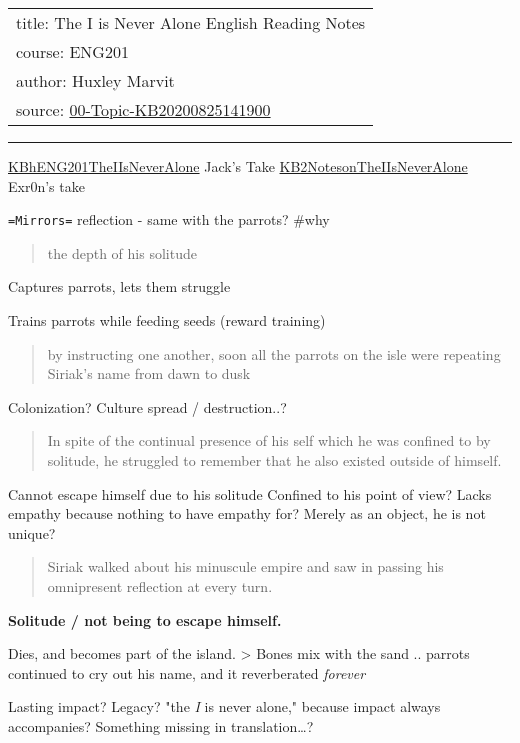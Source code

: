 \documentclass[letterpaper]{article}
\date{\today}
\title{}
\renewcommand{\tableofcontents}{}
\begin{document}
\tableofcontents

\begin{center}
\begin{tabular}{l}
title: The I is Never Alone English Reading Notes\\
course: ENG201\\
author: Huxley Marvit\\
source: \href{00-Topic-KB20200825141900.org}{00-Topic-KB20200825141900}\\
\end{tabular}
\end{center}

\noindent\rule{\textwidth}{0.5pt}

\href{KBhENG201TheIIsNeverAlone.org}{KBhENG201TheIIsNeverAlone} Jack's
Take \href{KB2NotesonTheIIsNeverAlone.org}{KB2NotesonTheIIsNeverAlone}
Exr0n's take

\texttt{=Mirrors=} reflection - same with the parrots? \#why

\begin{quote}
the depth of his solitude
\end{quote}

Captures parrots, lets them struggle

Trains parrots while feeding seeds (reward training)

\begin{quote}
by instructing one another, soon all the parrots on the isle were
repeating Siriak's name from dawn to dusk
\end{quote}

Colonization? Culture spread / destruction..?

\begin{quote}
In spite of the continual presence of his self which he was confined
to by solitude, he struggled to remember that he also existed outside
of himself.
\end{quote}

Cannot escape himself due to his solitude Confined to his point of view?
Lacks empathy because nothing to have empathy for? Merely as an object,
he is not unique?

\begin{quote}
Siriak walked about his minuscule empire and saw in passing his
omnipresent reflection at every turn.
\end{quote}

\textbf{Solitude / not being to escape himself.}

Dies, and becomes part of the island. > Bones mix with the sand ..
parrots continued to cry out his name, and it reverberated \emph{forever}

Lasting impact? Legacy? "the \emph{I} is never alone," because impact always
accompanies? Something missing in translation\ldots{}?
\end{document}
